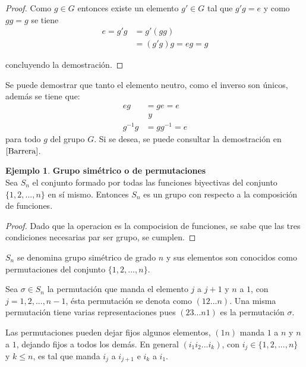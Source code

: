\documentclass[12pt]{book}
\theoremstyle{definition}
\newtheorem{example}{Ejemplo}
\begin{document}
\begin{proof}
 Como $g\in G$ entonces existe un elemento $g'\in G$ tal
que $g'g=e$ y como $gg=g$ se tiene
\begin{equation*}
  \begin{split}
    e=g'g&=g'(gg)\\
    &=(g'g)g=eg=g
  \end{split}
\end{equation*}

concluyendo la demostración.
\end{proof}

Se puede demostrar que tanto el elemento neutro, como el inverso son
únicos, además se tiene que:
\begin{equation*}
\begin{split}
eg&=ge=e\\ 
& \textit{    y   }\\
 g^{-1}g&=gg^{-1}=e
\end{split}
\end{equation*}
para todo  $g$ del grupo $G$. Si se desea, se puede consultar la demostración
en $\cite{Barrera}$.

\begin{example}\textbf{Grupo simétrico o de
    permutaciones}\\
  Sea $S_n$ el conjunto formado por todas las funciones
  biyectivas del conjunto $\{1,2,...,n \}$ en sí mismo. Entonces $S_n$ es un
  grupo con respecto a la composición de funciones.


\begin{proof}

Dado que la operacion es la compocision de funciones, se sabe que las
tres condiciones necesarias par ser grupo, se cumplen. 
\end{proof}

  $S_n$ se denomina grupo simétrico de grado $n$ y sus elementos son
  conocidos como permutaciones del conjunto $\{1,2,...,n\}$.
\end{example}

Sea $\sigma \in S_n$ la permutación que manda el elemento $j$ a $j+1$
y $n$ a $1$, con $j=1,2,...,n-1$, ésta permutación se denota como
$(12...n)$. Una misma permutación tiene varias representaciones pues
$(23...n1)$ es la permutación $\sigma$.

Las permutaciones pueden dejar fijos algunos elementos, $(1n)$ manda
$1$ a $n$ y $n$ a $1$, dejando fijos a todos los demás. En general
$(i_1i_2...i_k)$, con $i_j\in \{ 1,2,...,n\}$ y $k\le n$, es tal que
manda $i_j$ a $i_{j+1}$ e $i_k$ a $i_1$.
\end{document}
